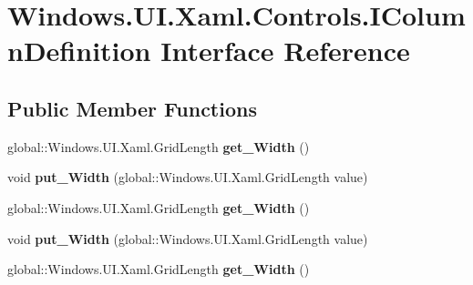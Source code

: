 \hypertarget{interface_windows_1_1_u_i_1_1_xaml_1_1_controls_1_1_i_column_definition}{}\section{Windows.\+U\+I.\+Xaml.\+Controls.\+I\+Column\+Definition Interface Reference}
\label{interface_windows_1_1_u_i_1_1_xaml_1_1_controls_1_1_i_column_definition}
\subsection*{Public Member Functions}
\begin{DoxyCompactItemize}
\item 
\mbox{\label{interface_windows_1_1_u_i_1_1_xaml_1_1_controls_1_1_i_column_definition_aeda3fef18a060b8631bd988c7ea2c77e}} 
global\+::\+Windows.\+U\+I.\+Xaml.\+Grid\+Length {\bfseries get\+\_\+\+Width} ()
\item 
\mbox{\label{interface_windows_1_1_u_i_1_1_xaml_1_1_controls_1_1_i_column_definition_ac5a45d834033be5522cf49d9121cd964}} 
void {\bfseries put\+\_\+\+Width} (global\+::\+Windows.\+U\+I.\+Xaml.\+Grid\+Length value)
\item 
\mbox{\label{interface_windows_1_1_u_i_1_1_xaml_1_1_controls_1_1_i_column_definition_aeda3fef18a060b8631bd988c7ea2c77e}} 
global\+::\+Windows.\+U\+I.\+Xaml.\+Grid\+Length {\bfseries get\+\_\+\+Width} ()
\item 
\mbox{\label{interface_windows_1_1_u_i_1_1_xaml_1_1_controls_1_1_i_column_definition_ac5a45d834033be5522cf49d9121cd964}} 
void {\bfseries put\+\_\+\+Width} (global\+::\+Windows.\+U\+I.\+Xaml.\+Grid\+Length value)
\item 
\mbox{\label{interface_windows_1_1_u_i_1_1_xaml_1_1_controls_1_1_i_column_definition_aeda3fef18a060b8631bd988c7ea2c77e}} 
global\+::\+Windows.\+U\+I.\+Xaml.\+Grid\+Length {\bfseries get\+\_\+\+Width} ()

\end{DoxyCompactItemize}

